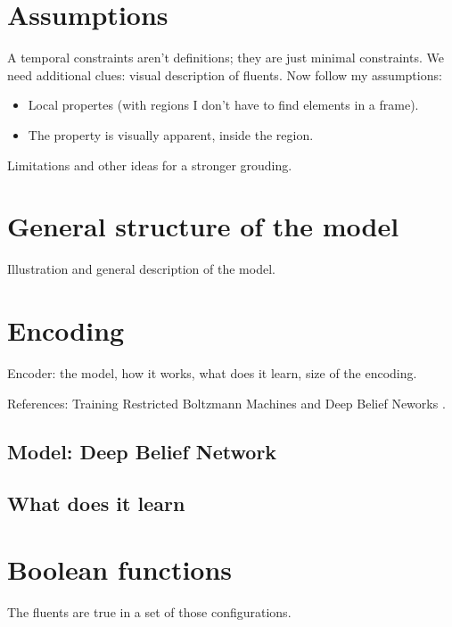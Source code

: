 

\section{Assumptions}

\label{sec:fluents-assumptions}

A temporal constraints aren't definitions; they are just minimal constraints.
We need additional clues: visual description of fluents.
Now follow my assumptions:
\begin{itemize}
	\item Local propertes (with regions I don't have to find elements in a
		frame).
	\item The property is visually apparent, inside the region.
\end{itemize}

Limitations and other ideas for a stronger grouding.

\section{General structure of the model}

Illustration and general description of the model.

\section{Encoding}

Encoder: the model, how it works, what does it learn, size of the encoding.

References:
Training Restricted Boltzmann Machines and Deep Belief Neworks
\cite{bib:rbm-training}\cite{bib:ml-book-murphy}.

\subsection{Model: Deep Belief Network}

\subsection{What does it learn}


\section{Boolean functions}

The fluents are true in a set of those configurations.

